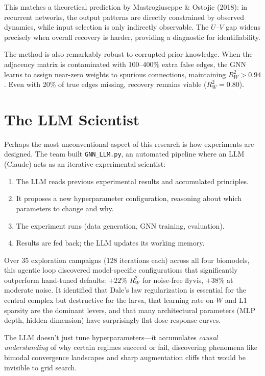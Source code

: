 \documentclass[11pt,twocolumn]{article}
\begin{document}
This matches a theoretical prediction by Mastrogiuseppe \& Ostojic (2018): in recurrent networks, the output patterns are directly constrained by observed dynamics, while input selection is only indirectly observable. The $U$--$V$ gap widens precisely when overall recovery is harder, providing a diagnostic for identifiability.

The method is also remarkably robust to corrupted prior knowledge. When the adjacency matrix is contaminated with 100--400\% extra false edges, the GNN learns to assign near-zero weights to spurious connections, maintaining $R^2_W > 0.94$. Even with 20\% of true edges missing, recovery remains viable ($R^2_W = 0.80$).

\section{The LLM Scientist}

Perhaps the most unconventional aspect of this research is how experiments are designed. The team built \texttt{GNN\_LLM.py}, an automated pipeline where an LLM (Claude) acts as an iterative experimental scientist:

\begin{enumerate}[leftmargin=*,itemsep=2pt]
\item The LLM reads previous experimental results and accumulated principles.
\item It proposes a new hyperparameter configuration, reasoning about which parameters to change and why.
\item The experiment runs (data generation, GNN training, evaluation).
\item Results are fed back; the LLM updates its working memory.
\end{enumerate}

Over 35 exploration campaigns (128 iterations each) across all four biomodels, this agentic loop discovered model-specific configurations that significantly outperform hand-tuned defaults: $+22\%$ $R^2_W$ for noise-free flyvis, $+38\%$ at moderate noise. It identified that Dale's law regularization is essential for the central complex but destructive for the larva, that learning rate on $W$ and L1 sparsity are the dominant levers, and that many architectural parameters (MLP depth, hidden dimension) have surprisingly flat dose-response curves.

The LLM doesn't just tune hyperparameters---it accumulates \emph{causal understanding} of why certain regimes succeed or fail, discovering phenomena like bimodal convergence landscapes and sharp augmentation cliffs that would be invisible to grid search.
\end{document}
